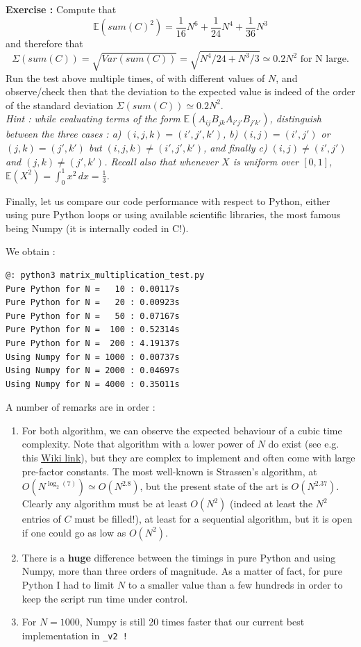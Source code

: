 \documentclass[12pt]{article}
\theoremstyle{plain}
\theoremstyle{remark}
\newcommand{\boE}{\mathbb{E}}
\begin{document}
\noindent
{\bf Exercise :} Compute that
$$
\boE(sum(C)^2) = \frac{1}{16}N^6 + \frac{1}{24}N^4 + \frac{1}{36}N^3
$$
and therefore that 
$$
\Sigma(sum(C)) = \sqrt{Var(sum(C))} = \sqrt{N^4/24 + N^3/3} \simeq 0.2 N^2
\text{ for N large}.
$$
Run the test above multiple times, of with different values of $N$, and
observe/check then that the deviation to the expected value is indeed 
of the order of the standard deviation $\Sigma(sum(C)) \simeq 0.2 N^2$.\\
{\it Hint : while evaluating terms of the form
$\boE(A_{ij}B_{jk}A_{i'j'}B_{j'k'})$, distinguish between the three cases : 
a) $(i,j,k) = (i',j',k')$, b) $(i,j) = (i',j')$ or $(j,k)=(j',k')$ but $(i,j,k)
\neq (i',j',k')$, and finally c) $(i,j) \neq (i',j')$ and $(j,k) \neq (j',k')$. 
Recall also that whenever $X$ is uniform over $[0,1]$, $\boE(X^2) = 
\int_0^1 x^2\, dx = \frac{1}{3}$.} 

\medskip

Finally, let us compare our code performance with respect to Python, either
using pure Python loops or using available scientific libraries, the most
famous being Numpy (it is internally coded in C!).



We obtain :  

\begin{lstlisting}[style=bash]
@: python3 matrix_multiplication_test.py
Pure Python for N =   10 : 0.00117s
Pure Python for N =   20 : 0.00923s
Pure Python for N =   50 : 0.07167s
Pure Python for N =  100 : 0.52314s
Pure Python for N =  200 : 4.19137s
Using Numpy for N = 1000 : 0.00737s
Using Numpy for N = 2000 : 0.04697s
Using Numpy for N = 4000 : 0.35011s
\end{lstlisting}

A number of remarks are in order :
\begin{enumerate}
\item
For both algorithm, we can observe the expected behaviour of a cubic time
complexity. Note that algorithm with a lower power of $N$ do exist (see e.g. 
this \href{https://en.wikipedia.org/wiki/Computational_complexity_of_matrix_multiplication}{Wiki link}),
but they are complex to implement and often come with large pre-factor
constants. The most well-known is Strassen's algorithm, at $O(N^{\log_2(7)})
\simeq O(N^{2.8})$, but the present state of the art is $O(N^{2.37})$. Clearly 
any algorithm must be at least $O(N^2)$ (indeed at least the $N^2$ entries of
$C$ must be filled!), at least for a sequential algorithm, but it is open if 
one could go as low as $O(N^2)$.
\item
There is a {\bf huge} difference between the timings in pure Python and using
Numpy, more than three orders of magnitude. As a matter of fact, for pure Python I 
had to limit $N$ to a smaller value than a few hundreds in order to keep the script run 
time under control.
\item 
For $N = 1000$, Numpy is still 20 times faster that our current best
implementation in \tt{\_v2} !
\end{enumerate}
\end{document}
